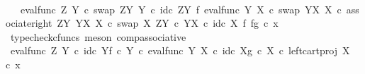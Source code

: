 \begin{isabellebody}
\ \ \ \ \isamarkupfalse%
\ \isamarkupfalse%
\ {\isachardoublequoteopen}{\isachardot}{\kern0pt}{\isachardot}{\kern0pt}{\isachardot}{\kern0pt}\ {\isacharequal}{\kern0pt}\ {\isacharparenleft}{\kern0pt}{\isacharparenleft}{\kern0pt}eval{\isacharunderscore}{\kern0pt}func\ Z\ Y\ {\isasymcirc}\isactrlsub c\ swap\ {\isacharparenleft}{\kern0pt}Z\isactrlbsup Y\isactrlesup {\isacharparenright}{\kern0pt}\ Y\ {\isasymcirc}\isactrlsub c\ {\isacharparenleft}{\kern0pt}id\isactrlsub c\ {\isacharparenleft}{\kern0pt}Z\isactrlbsup Y\isactrlesup {\isacharparenright}{\kern0pt}\ {\isasymtimes}\isactrlsub f\ eval{\isacharunderscore}{\kern0pt}func\ Y\ X\ {\isasymcirc}\isactrlsub c\ swap\ {\isacharparenleft}{\kern0pt}Y\isactrlbsup X\isactrlesup {\isacharparenright}{\kern0pt}\ X{\isacharparenright}{\kern0pt}\ {\isasymcirc}\isactrlsub c\ associate{\isacharunderscore}{\kern0pt}right\ {\isacharparenleft}{\kern0pt}Z\isactrlbsup Y\isactrlesup {\isacharparenright}{\kern0pt}\ {\isacharparenleft}{\kern0pt}Y\isactrlbsup X\isactrlesup {\isacharparenright}{\kern0pt}\ X\ {\isasymcirc}\isactrlsub c\ swap\ X\ {\isacharparenleft}{\kern0pt}Z\isactrlbsup Y\isactrlesup \ {\isasymtimes}\isactrlsub c\ Y\isactrlbsup X\isactrlesup {\isacharparenright}{\kern0pt}{\isacharparenright}{\kern0pt}\ {\isasymcirc}\isactrlsub c\ id\isactrlsub c\ X\ {\isasymtimes}\isactrlsub f\ {\isasymlangle}f{\isacharcomma}{\kern0pt}g{\isasymrangle}{\isacharparenright}{\kern0pt}\ {\isasymcirc}\isactrlsub c\ x{}{\isachardoublequoteclose}\isanewline
\ \ \ \ \ \ \isamarkupfalse%
\ {\isacharparenleft}{\kern0pt}typecheck{\isacharunderscore}{\kern0pt}cfuncs{\isacharcomma}{\kern0pt}\ meson\ comp{\isacharunderscore}{\kern0pt}associative{}{\isacharparenright}{\kern0pt}\isanewline
\ \ \ \ \isamarkupfalse%
\ \isamarkupfalse%
\ {\isachardoublequoteopen}{\isacharparenleft}{\kern0pt}{\isacharparenleft}{\kern0pt}{\isacharparenleft}{\kern0pt}eval{\isacharunderscore}{\kern0pt}func\ Z\ Y\ {\isasymcirc}\isactrlsub c\ {\isasymlangle}id\isactrlsub c\ Y{\isacharcomma}{\kern0pt}f\ {\isasymcirc}\isactrlsub c\ {\isasymbeta}\isactrlbsub Y\isactrlesub {\isasymrangle}{\isacharparenright}{\kern0pt}\ {\isasymcirc}\isactrlsub c\ eval{\isacharunderscore}{\kern0pt}func\ Y\ X\ {\isasymcirc}\isactrlsub c\ {\isasymlangle}id\isactrlsub c\ X{\isacharcomma}{\kern0pt}g\ {\isasymcirc}\isactrlsub c\ {\isasymbeta}\isactrlbsub X\isactrlesub {\isasymrangle}{\isacharparenright}{\kern0pt}\ {\isasymcirc}\isactrlsub c\ left{\isacharunderscore}{\kern0pt}cart{\isacharunderscore}{\kern0pt}proj\ X\ {\isasymone}{\isacharparenright}{\kern0pt}\ {\isasymcirc}\isactrlsub c\ x{}\ {\isacharequal}{\kern0pt}\isanewline

\end{isabellebody}
